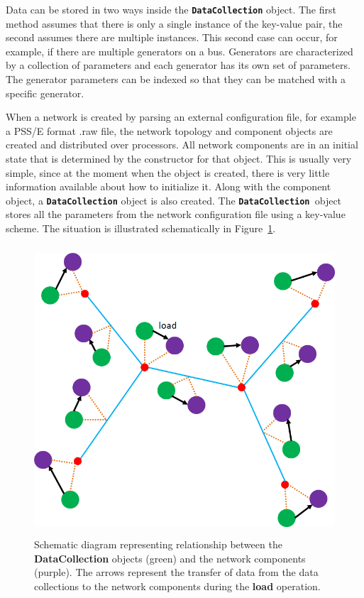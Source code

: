 \documentclass[12pt]{report} %
\begin{document}
Data can be stored in two ways inside the \texttt{\textbf{DataCollection}} object. The first method assumes that there is only a single instance of the key-value pair, the second assumes there are multiple instances. This second case can occur, for example, if there are multiple generators on a bus. Generators are characterized by a collection of parameters and each generator has its own set of parameters. The generator parameters can be indexed so that they can be matched with a specific generator.

When a network is created by parsing an external configuration file, for example a PSS/E format .raw file, the network topology and component objects are created and distributed over processors. All network components are in an initial state that is determined by the constructor for that object. This is usually very simple, since at the moment when the object is created, there is very little information available about how to initialize it. Along with the component object, a \texttt{\textbf{DataCollection}} object is also created. The \texttt{\textbf{DataCollection }}object stores all the parameters from the network configuration file using a key-value scheme. The situation is illustrated schematically in Figure~\ref{fig:fig-6}.

\begin{figure}
  \centering
    \includegraphics*[width=6.00in, height=4.24in, keepaspectratio=true]{Fig6-objects-network}
  \caption{Schematic diagram representing relationship between the \textbf{DataCollection} objects (green) and the network components (purple). The arrows represent the transfer of data from the data collections to the network components during the \textbf{load} operation.}
  \label{fig:fig-6}
\end{figure}
\end{document}
